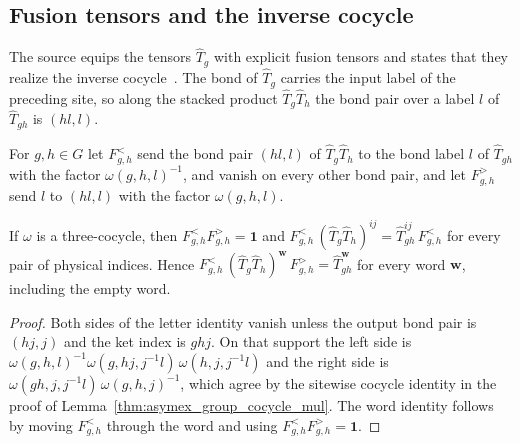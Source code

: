 \subsection{Fusion tensors and the inverse cocycle}

The source equips the tensors $\hat T_g$ with explicit fusion tensors and
states that they realize the inverse cocycle~\cite{GarreRubio2023MPOSym}.
The bond of $\hat T_g$ carries the input label of the preceding site, so
along the stacked product $\hat T_g\hat T_h$ the bond pair over a label
$l$ of $\hat T_{gh}$ is $(hl,l)$.

\begin{definition}
    \label{def:asymex_group_cocycle_fusion_tensors}
    \leanok
    For $g,h\in G$ let $F^<_{g,h}$ send the bond pair $(hl,l)$ of
    $\hat T_g\hat T_h$ to the bond label $l$ of $\hat T_{gh}$ with the
    factor $\omega(g,h,l)^{-1}$, and vanish on every other bond pair, and
    let $F^>_{g,h}$ send $l$ to $(hl,l)$ with the factor $\omega(g,h,l)$.
\end{definition}

\begin{lemma}
    \label{thm:asymex_group_cocycle_fusion}
    \leanok
    If $\omega$ is a three-cocycle, then $F^<_{g,h}F^>_{g,h}=\mathbf 1$ and
    $F^<_{g,h}\,(\hat T_g\hat T_h)^{ij}=\hat T_{gh}^{ij}\,F^<_{g,h}$ for every
    pair of physical indices. Hence
    $F^<_{g,h}\,(\hat T_g\hat T_h)^{\mathbf w}\,F^>_{g,h}=\hat T_{gh}^{\mathbf w}$
    for every word $\mathbf w$, including the empty word.
\end{lemma}

\begin{proof}
    \leanok
    Both sides of the letter identity vanish unless the output bond pair is
    $(hj,j)$ and the ket index is $ghj$. On that support the left side is
    $\omega(g,h,l)^{-1}\omega(g,hj,j^{-1}l)\,\omega(h,j,j^{-1}l)$ and the right
    side is $\omega(gh,j,j^{-1}l)\,\omega(g,h,j)^{-1}$, which agree by the
    sitewise cocycle identity in the proof of
    Lemma~\ref{thm:asymex_group_cocycle_mul}. The word identity follows by
    moving $F^<_{g,h}$ through the word and using $F^<_{g,h}F^>_{g,h}=\mathbf 1$.
\end{proof}

